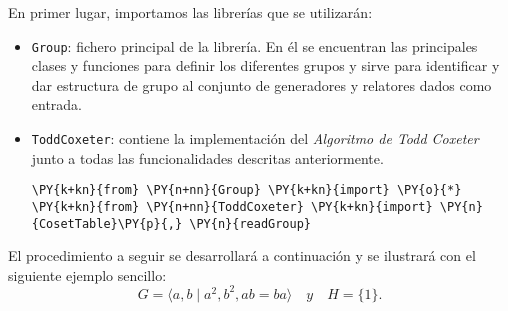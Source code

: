 
En primer lugar, importamos las librerías que se utilizarán:
\begin{itemize}
    \item  \texttt{Group}: fichero principal de la librería. En él se encuentran las principales clases y funciones para definir los diferentes grupos y sirve para identificar y dar estructura de grupo al conjunto de generadores y relatores dados como entrada. 
    \item  \texttt{ToddCoxeter}: contiene la implementación del \textit{Algoritmo de Todd Coxeter} junto a todas las funcionalidades descritas anteriormente. 


    \begin{tcolorbox}[breakable, size=fbox, boxrule=1pt, pad at break*=1mm,colback=cellbackground, colframe=cellborder]
\begin{Verbatim}[commandchars=\\\{\}]
\PY{k+kn}{from} \PY{n+nn}{Group} \PY{k+kn}{import} \PY{o}{*}
\PY{k+kn}{from} \PY{n+nn}{ToddCoxeter} \PY{k+kn}{import} \PY{n}{CosetTable}\PY{p}{,} \PY{n}{readGroup}
\end{Verbatim}
\end{tcolorbox}

\end{itemize}



El procedimiento a seguir se desarrollará a continuación y se ilustrará con el siguiente ejemplo sencillo:
\[
G=\langle a,b \mid a^2, b^2, ab=ba \rangle \quad y \quad H=\{1\}.
\]

